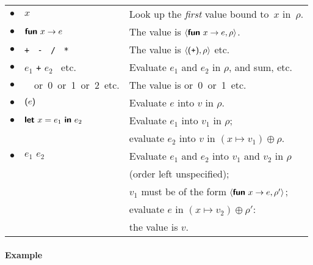 \begin{tabular}{@{}rll@{}}
    $\bullet$
  & $x$ 
  & Look up the \emph{first} value bound to~\(x\) in~\(\rho\).\\[2mm]
    $\bullet$
  & $\textsf{\textbf{fun}} \,\, x \rightarrow e$
  & The value is $\langle\textsf{\textbf{fun}} \,\, x \rightarrow e, \rho\rangle$.\\[2mm]
    $\bullet$
  & \texttt{+} \ \texttt{-} \ \texttt{/} \ \texttt{*}
  & The value is $\langle\textsf{(}\texttt{+}\textsf{)}, \rho\rangle$ etc.\\[2mm]
    $\bullet$
  & $e_1$ \texttt{+} $e_2$ \ etc.
  & Evaluate $e_1$ and $e_2$ in $\rho$, and sum, etc.\\[2mm]
    $\bullet$
  & \unit \ or \textsf{0} or \textsf{1} or \textsf{2} etc.
  & The value is \unit or \textsf{0} or \textsf{1} etc.\\[2mm]
    $\bullet$
  & $\textsf{(}{e}\textsf{)}$
  & Evaluate $e$ into $v$ in $\rho$.\\[2mm]
    $\bullet$
  & $\textsf{\textbf{let}} \,\, x = e_1 \,\, \textsf{\textbf{in}} \,\, e_2$
  & Evaluate $e_1$ into $v_1$ in $\rho$;\\
  & 
  & evaluate $e_2$ into $v$ in $(x \mapsto v_1) \oplus \rho$.\\[2mm]
    $\bullet$
  & $e_1 \,\, e_2$
  & Evaluate $e_1$ and $e_2$ into $v_1$ and $v_2$ in $\rho$\\
  &
  & (order left unspecified);\\
  &
  & $v_1$ must be of the form $\langle\textsf{\textbf{fun}} \,\, x \rightarrow
    e,\rho'\rangle$;\\
  &
  & evaluate $e$ in $(x \mapsto v_2) \oplus \rho'$:\\
  && the value is $v$.
\end{tabular}

\bigskip

\paragraph{Example}

